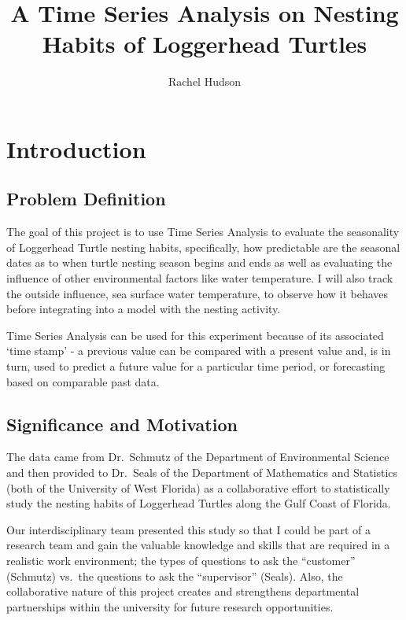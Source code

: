 \documentclass[
  letterpaper,
  DIV=11,
  numbers=noendperiod]{scrartcl}
\title{A Time Series Analysis on Nesting Habits of Loggerhead Turtles}
\author{Rachel Hudson}
\date{}
\renewcommand*\contentsname{Table of contents}
\newcommand\contentsname{Table of contents}
\begin{document}
\maketitle

\renewcommand*\contentsname{Table of contents}
{
\hypersetup{linkcolor=}
\setcounter{tocdepth}{3}
\tableofcontents
}

\section{Introduction}\label{introduction}

\subsection{Problem Definition}\label{problem-definition}

The goal of this project is to use Time Series Analysis to evaluate the
seasonality of Loggerhead Turtle nesting habits, specifically, how
predictable are the seasonal dates as to when turtle nesting season
begins and ends as well as evaluating the influence of other
environmental factors like water temperature. I will also track the
outside influence, sea surface water temperature, to observe how it
behaves before integrating into a model with the nesting activity.

Time Series Analysis can be used for this experiment because of its
associated `time stamp' - a previous value can be compared with a
present value and, is in turn, used to predict a future value for a
particular time period, or forecasting based on comparable past data.

\subsection{Significance and
Motivation}\label{significance-and-motivation}

The data came from Dr.~Schmutz of the Department of Environmental
Science and then provided to Dr.~Seals of the Department of Mathematics
and Statistics (both of the University of West Florida) as a
collaborative effort to statistically study the nesting habits of
Loggerhead Turtles along the Gulf Coast of Florida.

Our interdisciplinary team presented this study so that I could be part
of a research team and gain the valuable knowledge and skills that are
required in a realistic work environment; the types of questions to ask
the ``customer'' (Schmutz) vs.~the questions to ask the ``supervisor''
(Seals). Also, the collaborative nature of this project creates and
strengthens departmental partnerships within the university for future
research opportunities.
\end{document}
